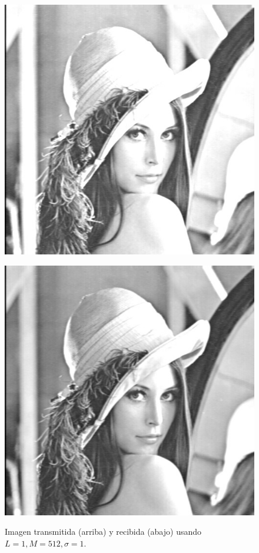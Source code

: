 \documentclass[10pt,journal,compsoc]{IEEEtran}
\begin{document}
\begin{figure}
\begin{center}
\begin{minipage}{.5\textwidth}
  \includegraphics[scale=0.25]{../Linterno5/512/1/imgTrans.jpg}
\end{minipage}
\vspace{0cm}
\begin{minipage}{.5\textwidth}
  \centering
  \includegraphics[scale=0.25]{../Linterno5/512/1/imgRec.jpg}
  \label{fig:sub2}
\end{minipage}
\caption{Imagen transmitida (arriba) y recibida (abajo) usando $L=1 , M=512, \sigma=1$.}
\label{fig:test}
\end{center}
\end{figure}
\end{document}
